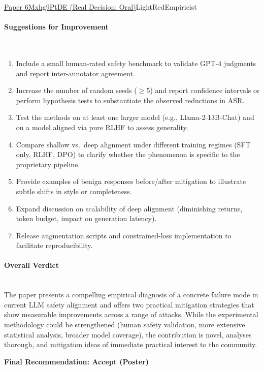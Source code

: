 \documentclass{article} %
\begin{document}
\begin{reviewbox}{\href{https://openreview.net/forum?id=6Mxhg9PtDE}{Paper 6Mxhg9PtDE (Real Decision: Oral)}}{LightRed}{Empiricist}
\paragraph{Suggestions for Improvement}
\leavevmode\\[0.1em]
\begin{enumerate}[leftmargin=0.5em, itemsep=0pt, topsep=0pt]
  \item Include a small human-rated safety benchmark to validate GPT-4 judgments and report inter-annotator agreement.
  \item Increase the number of random seeds ($\ge5$) and report confidence intervals or perform hypothesis tests to substantiate the observed reductions in ASR.
  \item Test the methods on at least one larger model (e.g., Llama-2-13B-Chat) and on a model aligned via pure RLHF to assess generality.
  \item Compare shallow vs.\ deep alignment under different training regimes (SFT only, RLHF, DPO) to clarify whether the phenomenon is specific to the proprietary pipeline.
  \item Provide examples of benign responses before/after mitigation to illustrate subtle shifts in style or completeness.
  \item Expand discussion on scalability of deep alignment (diminishing returns, token budget, impact on generation latency).
  \item Release augmentation scripts and constrained-loss implementation to facilitate reproducibility.
\end{enumerate}

\paragraph{Overall Verdict}
\leavevmode\\[0.1em]
The paper presents a compelling empirical diagnosis of a concrete failure mode in current LLM safety alignment and offers two practical mitigation strategies that show measurable improvements across a range of attacks. While the experimental methodology could be strengthened (human safety validation, more extensive statistical analysis, broader model coverage), the contribution is novel, analyses thorough, and mitigation ideas of immediate practical interest to the community.

\textbf{Final Recommendation: Accept (Poster)}
\end{reviewbox}
\end{document}
